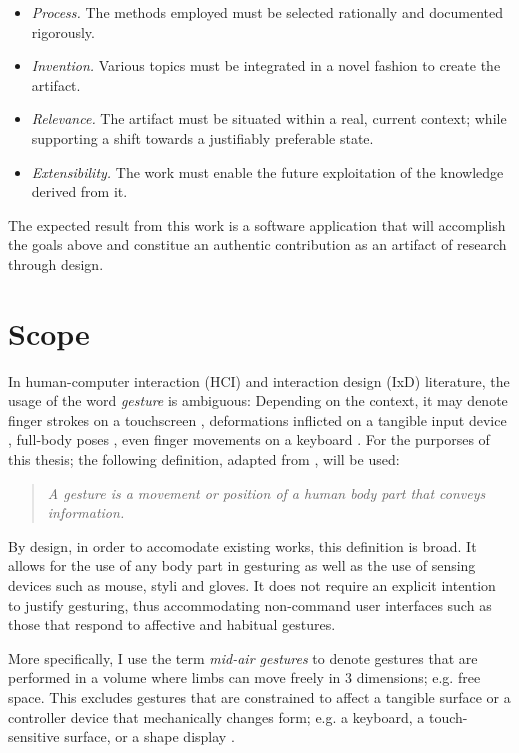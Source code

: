 \begin{itemize}
\item \emph{Process.} The methods employed must be selected rationally and documented rigorously.
\item \emph{Invention.} Various topics must be integrated in a novel fashion to create the artifact.
\item \emph{Relevance.} The artifact must be situated within a real, current context; while supporting a shift towards a justifiably preferable state.
\item \emph{Extensibility.} The work must enable the future exploitation of the knowledge derived from it.
\end{itemize}

The expected result from this work is a software application that will accomplish the goals above and constitue an authentic contribution as an artifact of research through design.

\section{Scope} %

In human-computer interaction (HCI) and interaction design (IxD) literature, the usage of the word \emph{gesture} is ambiguous: Depending on the context, it may denote finger strokes on a touchscreen \parencite{Lu:2013}, deformations inflicted on a tangible input device \parencite{Warren:2013}, full-body poses \parencite{Walter:2013}, even finger movements on a keyboard \parencite{Zhang:2014}. For the purporses of this thesis; the following definition, adapted from \textcite{Kurtenbach:1990}, will be used:

\begin{quote}
\emph{A gesture is a movement or position of a human body part that conveys information.}
\end{quote}

By design, in order to accomodate existing works, this definition is broad. It allows for the use of any body part in gesturing as well as the use of sensing devices such as mouse, styli and gloves. It does not require an explicit intention to justify gesturing, thus accommodating non-command user interfaces \parencite{Nielsen:1993} such as those that respond to affective \parencite{Kapur:2005} and habitual \parencite{Liu:2009} gestures.

More specifically, I use the term \emph{mid-air gestures} to denote gestures that are performed in a volume where limbs can move freely in 3 dimensions; e.g. free space. This excludes gestures that are constrained to affect a tangible surface or a controller device that mechanically changes form; e.g. a keyboard, a touch-sensitive surface, or a shape display \parencite{Follmer:2013}.


